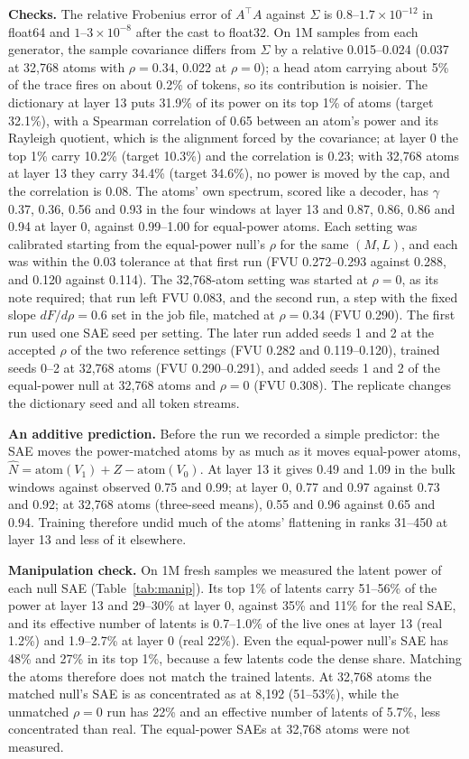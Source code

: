 \documentclass{article}
\newcommand{\Sig}{\Sigma}
\begin{document}
\textbf{Checks.} The relative Frobenius error of $A^\top A$ against $\Sig$ is $0.8$--$1.7\times10^{-12}$ in float64 and $1$--$3\times10^{-8}$ after the cast to float32. On 1M samples from each generator, the sample covariance differs from $\Sig$ by a relative 0.015--0.024 (0.037 at 32,768 atoms with $\rho=0.34$, 0.022 at $\rho=0$); a head atom carrying about 5\% of the trace fires on about 0.2\% of tokens, so its contribution is noisier. The dictionary at layer 13 puts 31.9\% of its power on its top 1\% of atoms (target 32.1\%), with a Spearman correlation of 0.65 between an atom's power and its Rayleigh quotient, which is the alignment forced by the covariance; at layer 0 the top 1\% carry 10.2\% (target 10.3\%) and the correlation is 0.23; with 32,768 atoms at layer 13 they carry 34.4\% (target 34.6\%), no power is moved by the cap, and the correlation is 0.08. The atoms' own spectrum, scored like a decoder, has $\gamma$ 0.37, 0.36, 0.56 and 0.93 in the four windows at layer 13 and 0.87, 0.86, 0.86 and 0.94 at layer 0, against 0.99--1.00 for equal-power atoms. Each setting was calibrated starting from the equal-power null's $\rho$ for the same $(M,L)$, and each was within the 0.03 tolerance at that first run (FVU 0.272--0.293 against 0.288, and 0.120 against 0.114). The 32,768-atom setting was started at $\rho=0$, as its note required; that run left FVU 0.083, and the second run, a step with the fixed slope $dF/d\rho=0.6$ set in the job file, matched at $\rho=0.34$ (FVU 0.290). The first run used one SAE seed per setting. The later run added seeds 1 and 2 at the accepted $\rho$ of the two reference settings (FVU 0.282 and 0.119--0.120), trained seeds 0--2 at 32,768 atoms (FVU 0.290--0.291), and added seeds 1 and 2 of the equal-power null at 32,768 atoms and $\rho=0$ (FVU 0.308). The replicate changes the dictionary seed and all token streams.

\textbf{An additive prediction.} Before the run we recorded a simple predictor: the SAE moves the power-matched atoms by as much as it moves equal-power atoms, $\hat N = \mathrm{atom}(V_1) + Z - \mathrm{atom}(V_0)$. At layer 13 it gives 0.49 and 1.09 in the bulk windows against observed 0.75 and 0.99; at layer 0, 0.77 and 0.97 against 0.73 and 0.92; at 32,768 atoms (three-seed means), 0.55 and 0.96 against 0.65 and 0.94. Training therefore undid much of the atoms' flattening in ranks 31--450 at layer 13 and less of it elsewhere.

\textbf{Manipulation check.} On 1M fresh samples we measured the latent power of each null SAE (Table~\ref{tab:manip}). Its top 1\% of latents carry 51--56\% of the power at layer 13 and 29--30\% at layer 0, against 35\% and 11\% for the real SAE, and its effective number of latents is 0.7--1.0\% of the live ones at layer 13 (real 1.2\%) and 1.9--2.7\% at layer 0 (real 22\%). Even the equal-power null's SAE has 48\% and 27\% in its top 1\%, because a few latents code the dense share. Matching the atoms therefore does not match the trained latents. At 32,768 atoms the matched null's SAE is as concentrated as at 8,192 (51--53\%), while the unmatched $\rho=0$ run has 22\% and an effective number of latents of 5.7\%, less concentrated than real. The equal-power SAEs at 32,768 atoms were not measured.
\end{document}
